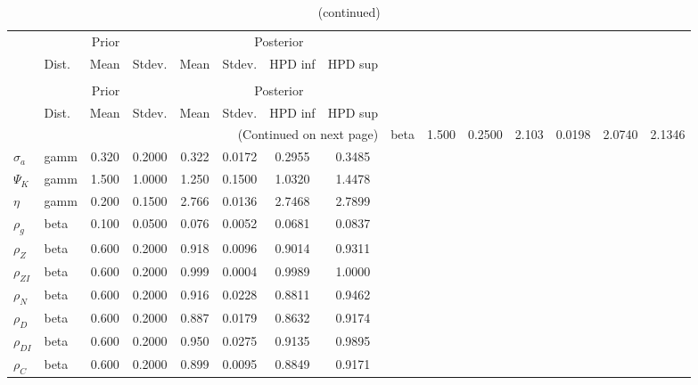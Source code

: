  
\begin{center}
\begin{longtable}{llcccccc} 
\caption{Results from Metropolis-Hastings (parameters)}
 \label{Table:MHPosterior:1}\\
\toprule 
  & \multicolumn{3}{c}{Prior}  &  \multicolumn{4}{c}{Posterior} \\
  \cmidrule(r{.75em}){2-4} \cmidrule(r{.75em}){5-8}
  & Dist. & Mean  & Stdev. & Mean & Stdev. & HPD inf & HPD sup\\
\midrule \endfirsthead 
\caption{(continued)}\\\toprule 
  & \multicolumn{3}{c}{Prior}  &  \multicolumn{4}{c}{Posterior} \\
  \cmidrule(r{.75em}){2-4} \cmidrule(r{.75em}){5-8}
  & Dist. & Mean  & Stdev. & Mean & Stdev. & HPD inf & HPD sup\\
\midrule \endhead 
\bottomrule \multicolumn{8}{r}{(Continued on next page)} \endfoot 
\bottomrule \endlastfoot 
${\gamma}$ & beta &   1.500 & 0.2500 &   2.103& 0.0198 &  2.0740 &  2.1346 \\ 
${\sigma_a}$ & gamm &   0.320 & 0.2000 &   0.322& 0.0172 &  0.2955 &  0.3485 \\ 
${\Psi_K}$ & gamm &   1.500 & 1.0000 &   1.250& 0.1500 &  1.0320 &  1.4478 \\ 
${\eta}$ & gamm &   0.200 & 0.1500 &   2.766& 0.0136 &  2.7468 &  2.7899 \\ 
${\rho_g}$ & beta &   0.100 & 0.0500 &   0.076& 0.0052 &  0.0681 &  0.0837 \\ 
${\rho_Z}$ & beta &   0.600 & 0.2000 &   0.918& 0.0096 &  0.9014 &  0.9311 \\ 
${\rho_{ZI}}$ & beta &   0.600 & 0.2000 &   0.999& 0.0004 &  0.9989 &  1.0000 \\ 
${\rho_N}$ & beta &   0.600 & 0.2000 &   0.916& 0.0228 &  0.8811 &  0.9462 \\ 
${\rho_D}$ & beta &   0.600 & 0.2000 &   0.887& 0.0179 &  0.8632 &  0.9174 \\ 
${\rho_{DI}}$ & beta &   0.600 & 0.2000 &   0.950& 0.0275 &  0.9135 &  0.9895 \\ 
${\rho_C}$ & beta &   0.600 & 0.2000 &   0.899& 0.0095 &  0.8849 &  0.9171 \\ 
\end{longtable}
 \end{center}
